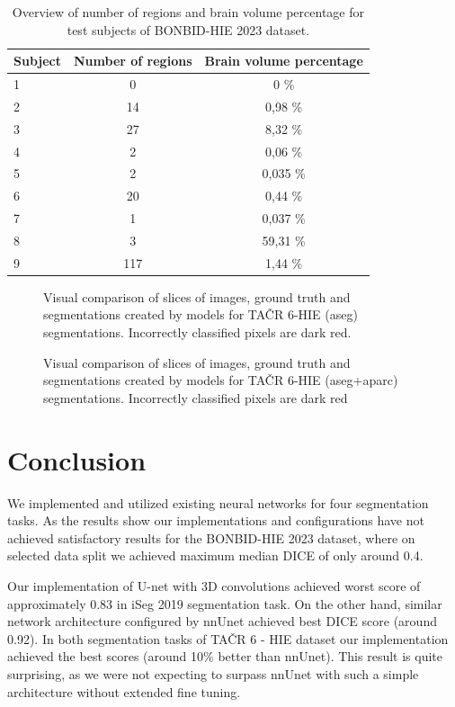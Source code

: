\documentclass[runningheads]{llncs}
\begin{document}
\begin{table}
\centering
\begin{tabular}{l c c}
\hline
\textbf{Subject} & \textbf{Number of regions} & \textbf{Brain volume percentage} \\
\hline
1 & 0   & 0 \% \\
2 & 14  & 0{,}98 \% \\
3 & 27  & 8{,}32 \% \\
4 & 2   & 0{,}06 \% \\
5 & 2   & 0{,}035 \% \\
6 & 20  & 0{,}44 \% \\
7 & 1   & 0{,}037 \% \\
8 & 3   & 59{,}31 \% \\
9 & 117 & 1{,}44 \% \\
\hline
\end{tabular}
\caption{Overview of number of regions and brain volume percentage for test subjects of BONBID-HIE 2023 dataset.}
\label{tab:bonbidtestlegend}
\end{table}

\begin{figure}
\centering

\caption{Visual comparison of slices of images, ground truth and segmentations created by models for TAČR 6-HIE (aseg) segmentations. Incorrectly classified pixels are dark red.}
\label{fig:tacrasegslicecomparison}
\end{figure}

\begin{figure}
\centering
\caption{Visual comparison of slices of images, ground truth and segmentations created by models for TAČR 6-HIE (aseg+aparc) segmentations. Incorrectly classified pixels are dark red}
\label{fig:tacraparcslicecomparison}

\end{figure}

\section{Conclusion}
We implemented and utilized existing neural networks for four segmentation tasks. As the results show our implementations and configurations have not achieved satisfactory results for the BONBID-HIE 2023 dataset, where on selected data split we achieved maximum median DICE of only around 0.4. 

Our implementation of U-net with 3D convolutions achieved worst score of approximately 0.83 in iSeg 2019 segmentation task. On the other hand, similar network architecture configured by nnUnet  achieved best DICE score (around 0.92). In both segmentation tasks of TAČR 6 - HIE dataset our implementation achieved the best scores (around 10\% better than nnUnet). This result is quite surprising, as we were not expecting to surpass nnUnet with such a simple architecture without extended fine tuning.
\end{document}

